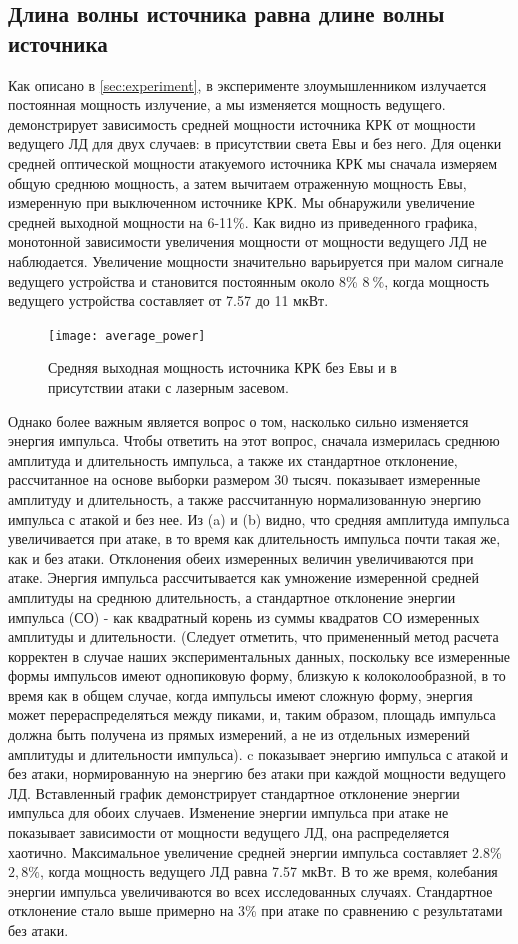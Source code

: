 \subsection{Длина волны источника равна длине волны источника}

Как описано в \cref{sec:experiment}, в эксперименте злоумышленником излучается постоянная мощность излучение, а мы изменяется мощность ведущего.  демонстрирует зависимость средней мощности источника КРК от мощности ведущего ЛД для двух случаев: в присутствии света Евы и без него. Для оценки средней оптической мощности атакуемого источника КРК мы сначала измеряем общую среднюю мощность, а затем вычитаем отраженную мощность Евы, измеренную при выключенном источнике КРК. Мы обнаружили увеличение средней выходной мощности на 6-11\%. Как видно из приведенного графика, монотонной зависимости увеличения мощности от мощности ведущего ЛД не наблюдается. Увеличение мощности значительно варьируется при малом сигнале ведущего устройства и становится постоянным около 8\% $8~\%$, когда мощность ведущего устройства составляет от 7.57 до 11 мкВт.
\begin{figure}
\texttt{[image: average\_power]}
\caption{Средняя выходная мощность источника КРК без Евы и в присутствии атаки с лазерным засевом.}
\label{fig:average_power}
\end{figure}
Однако более важным является вопрос о том, насколько сильно изменяется энергия импульса. Чтобы ответить на этот вопрос, сначала измерилась среднюю амплитуда и длительность импульса, а также их стандартное отклонение, рассчитанное на основе выборки размером 30 тысяч.  показывает измеренные амплитуду и длительность, а также рассчитанную нормализованную энергию импульса с атакой и без нее. Из (a) и (b) видно, что средняя амплитуда импульса увеличивается при атаке, в то время как длительность импульса почти такая же, как и без атаки. Отклонения обеих измеренных величин увеличиваются при атаке. Энергия импульса рассчитывается как умножение измеренной средней амплитуды на среднюю длительность, а стандартное отклонение энергии импульса (СО) - как квадратный корень из суммы квадратов СО измеренных амплитуды и длительности. (Следует отметить, что примененный метод расчета корректен в случае наших экспериментальных данных, поскольку все измеренные формы импульсов имеют однопиковую форму, близкую к колоколообразной, в то время как в общем случае, когда импульсы имеют сложную форму, энергия может перераспределяться между пиками, и, таким образом, площадь импульса должна быть получена из прямых измерений, а не из отдельных измерений амплитуды и длительности импульса). c показывает энергию импульса с атакой и без атаки, нормированную на энергию без атаки при каждой мощности ведущего ЛД. Вставленный график демонстрирует стандартное отклонение энергии импульса для обоих случаев. Изменение энергии импульса при атаке не показывает зависимости от мощности ведущего ЛД, она распределяется хаотично. Максимальное увеличение средней энергии импульса составляет 2.8\%$2,8\%$, когда мощность ведущего ЛД равна 7.57 мкВт. В то же время, колебания энергии импульса увеличиваются во всех исследованных случаях. Стандартное отклонение стало выше примерно на 3\% при атаке по сравнению с результатами без атаки.

